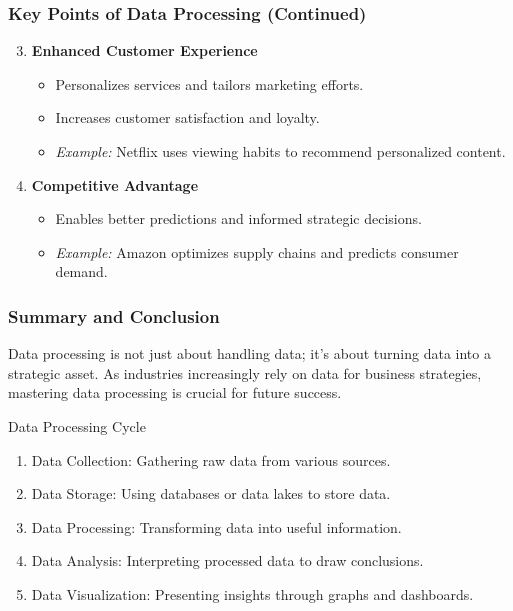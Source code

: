 \documentclass[aspectratio=169]{beamer}
\begin{document}
\begin{frame}[fragile]
    \frametitle{Key Points of Data Processing (Continued)}
    \begin{enumerate}
        \setcounter{enumi}{2}
        \item \textbf{Enhanced Customer Experience}
        \begin{itemize}
            \item Personalizes services and tailors marketing efforts.
            \item Increases customer satisfaction and loyalty.
            \item \textit{Example:} Netflix uses viewing habits to recommend personalized content.
        \end{itemize}
        
        \item \textbf{Competitive Advantage}
        \begin{itemize}
            \item Enables better predictions and informed strategic decisions.
            \item \textit{Example:} Amazon optimizes supply chains and predicts consumer demand.
        \end{itemize}
    \end{enumerate}
\end{frame}

\begin{frame}[fragile]
    \frametitle{Summary and Conclusion}
    Data processing is not just about handling data; it's about turning data into a strategic asset. As industries increasingly rely on data for business strategies, mastering data processing is crucial for future success.

    \begin{block}{Data Processing Cycle}
        \begin{enumerate}
            \item Data Collection: Gathering raw data from various sources.
            \item Data Storage: Using databases or data lakes to store data.
            \item Data Processing: Transforming data into useful information.
            \item Data Analysis: Interpreting processed data to draw conclusions.
            \item Data Visualization: Presenting insights through graphs and dashboards.
        \end{enumerate}
    \end{block}
\end{frame}
\end{document}
